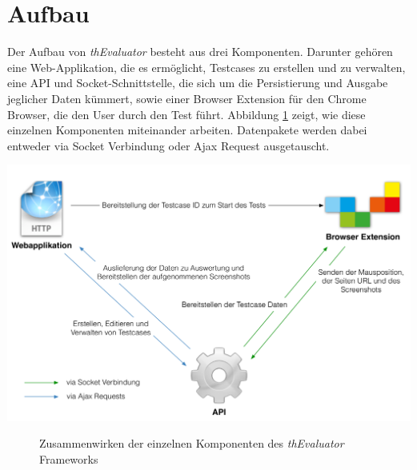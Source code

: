 %
%
%
%

\section{Aufbau}

Der Aufbau von \textit{thEvaluator} besteht aus drei Komponenten. Darunter gehören eine Web-Applikation, die es ermöglicht, Testcases zu erstellen und zu verwalten, eine API und Socket-Schnittstelle, die sich um die Persistierung und Ausgabe jeglicher Daten kümmert, sowie einer Browser Extension für den Chrome Browser, die den User durch den Test führt. Abbildung \ref{structure} zeigt, wie diese einzelnen Komponenten miteinander arbeiten. Datenpakete werden dabei entweder via Socket Verbindung oder Ajax Request ausgetauscht.

\begin{center}
\includegraphics[scale=0.49]{./images/structure}
\end{center}
\begin{figure}[htb]
   \centering
   \caption{Zusammenwirken der einzelnen Komponenten des \textit{thEvaluator} Frameworks}
    \label{structure}
\end{figure}
\newpage